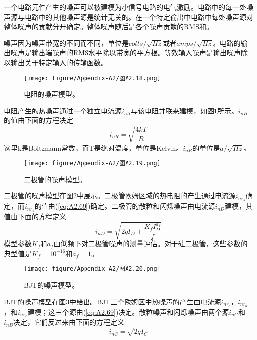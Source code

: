一个电路元件产生的噪声可以被建模为小信号电路的电气激励。电路中的每一处噪声源与电路中的其他噪声源是统计无关的。在一个特定输出中电路中每处噪声源对整体噪声的贡献分开确定。整体噪声随后是各个噪声贡献的RMS和。

噪声因为噪声带宽的不同而不同，单位是$volts/\sqrt{Hz}$或者$amps/\sqrt{Hz}$。电路的输出噪声是输出端噪声的RMS水平除以带宽的平方根。等效输入噪声是输出噪声除以输出关于特定输入的传输函数。

\begin{figure}[htbp]
\small
    \centering
    \texttt{[image: figure/Appendix-A2/图A2.18.png]}
    \caption{电阻的噪声模型。}
    \label{图A2.18}
\end{figure}

电阻产生的热噪声通过一个独立电流源$i_{nR}$与该电阻并联来建模，如图\ref{图A2.18}所示。$i_{nR}$的值由下面的方程决定
\begin{equation}
    i_{nR} = \sqrt{\frac{4kT}{R}}
    \label{eq:A2.69}
\end{equation}
这里k是Boltzmann常数，而T是绝对温度，单位是Kelvin。$i_{nR}$的单位是$a/\sqrt{Hz}$。

\begin{figure}[htbp]
\small
    \centering
    \texttt{[image: figure/Appendix-A2/图A2.19.png]}
    \caption{二极管的噪声模型。}
    \label{图A2.19}
\end{figure}

二极管的噪声模型在图\ref{图A2.19}中展示。二极管欧姆区域的热电阻的产生通过电流源$i_{nr_s}$确定，而$i_{nr_s}$的值由(\ref{eq:A2.69})确定。二极管的散粒和闪烁噪声由电流源$i_{nD}$建模，其值由下面的方程定义
\begin{equation}
    i_{nD} = \sqrt{2qI_D + \frac{K_fI^{a_f}_D}{f}}
    \label{eq:A2.70}
\end{equation}
模型参数$K_f$和$a_f$由低频下对二极管噪声的测量评估。对于硅二极管，这些参数的典型值是$K_f=10^{-16}$和$a_f=1$。

\begin{figure}[htbp]
\small
    \centering
    \texttt{[image: figure/Appendix-A2/图A2.20.png]}
    \caption{BJT的噪声模型。}
    \label{图A2.20}
\end{figure}

BJT的噪声模型在图\ref{图A2.20}中给出。BJT三个欧姆区中热噪声的产生由电流源$i_{nr_c}$，$i_{nr_b}$，和$i_{nr_e}$建模；这三个源由(\ref{eq:A2.69})决定。散粒噪声和闪烁噪声由两个源$i_{nC}$和$i_{nB}$决定，它们反过来由下面的方程定义
\begin{equation}
    i_{nC} = \sqrt{2qI_C}
    \label{eq:A2.71}
\end{equation}

